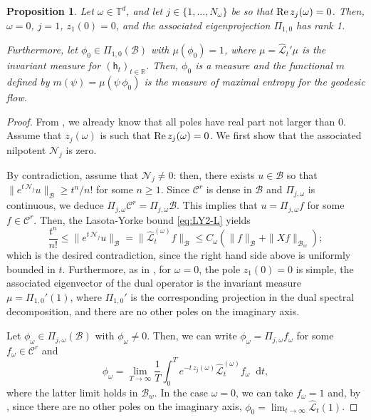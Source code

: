 \documentclass[11pt,letterpaper]{amsart}
\newcommand \cL {{\mathcal L}}
\newcommand \R {{ \mathbb R}}
\newcommand \T {{ \mathbb T}}
\newcommand \cB {{\mathscr B}}
\newcommand{\horo}{\mathsf{h}}
\newcommand*{\diff}{\mathop{}\!\mathrm{d}}
\newcommand \re {{%
\operatorname{Re}
}}
\newtheorem {proposition}[theorem]{Proposition}
\theoremstyle{definition}
\begin{document}
\begin{proposition}\label{prop:zero_is_simple}
	Let $\omega \in \T^d$, and let $j \in \{1,\dots, N_{\omega}\}$ be so that $\re \, z_j(\omega) = 0$. Then, $\omega=0$, $j=1$, $z_1(0)=0$, and the associated eigenprojection $\Pi_{1,0}$ has rank 1.

Furthermore, let $\phi_0 \in \Pi_{1,0}(\cB)$ with $\mu(\phi_0) =1$, where  $\mu = \hat \cL_t' \mu$ is the invariant measure for $(\horo_t)_{t\in \R}$. Then,  $\phi_0$ is a measure and the functional $m$ defined by $m(\psi) =\mu(\psi \, \phi_0)$ is the measure of maximal entropy for the geodesic flow.
\end{proposition}
\begin{proof}
	From , we already know that all poles have real part not larger than 0. Assume that $z_j(\omega)$ is such that $\re \, z_j(\omega) = 0$. We first show that the associated nilpotent $\mathcal{N}_j$ is zero.
	
	By contradiction, assume that $\mathcal{N}_j \neq 0$: then, there exists $u \in \cB$ so that $\|e^{t \, \mathcal{N}_j} u \|_{\cB} \geq t^n/n!$ for some $n \geq 1$. Since $\mathscr{C}^r$ is dense in $\cB$ and $\Pi_{j,\omega}$ is continuous, we deduce $ \Pi_{j,\omega}\mathscr{C}^r = \Pi_{j,\omega} \cB$. This implies that $u = \Pi_{j,\omega}f$ for some $f \in \mathscr{C}^r$.
	Then, the Lasota-Yorke bound \eqref{eq:LY2-L} yields
	\[
	\frac{t^n}{n!} \leq \|e^{t \, \mathcal{N}_j} u \|_{\cB} = \| {\hat \cL^{(\omega)}_t} f\|_{\cB} \leq C_{\omega}(\|f\|_{\cB} + \|Xf\|_{\cB_w} );
	\]
	which is the desired contradiction, since the right hand side above is uniformly bounded in $t$.
	Furthermore, as in \cite[Lemma 4.6]{AdBa}, for $\omega = 0$, the pole $z_1(0)=0$ is simple, the associated eigenvector of the dual operator is the invariant measure $\mu = \Pi_{1,0}'(1)$, where $\Pi_{1,0}'$ is the corresponding projection in the dual spectral decomposition, and there are no other poles on the imaginary axis. 
	
	Let $\phi_{\omega}\in \Pi_{j,\omega}(\cB)$ with $\phi_{\omega}\neq 0$. Then, we can write $\phi_{\omega} = \Pi_{j,\omega}f_{\omega}$ for some $f_{\omega} \in \mathscr{C}^r$ and
	\[
	\phi_{\omega} = \lim_{T \to \infty} \frac{1}{T} \int_0^T e^{-t \, z_j(\omega)} {\hat \cL^{(\omega)}_t} f_{\omega} \diff t,
	\]
	where the latter limit holds in $\cB_w$. 
	In the case $\omega = 0$, we can take $f_{\omega}=1$ and, by , since there are no other poles on the imaginary axis,  $\phi_0 = \lim_{t \to \infty} {\hat \cL_t}(1)$.


\end{proof}
\end{document}
